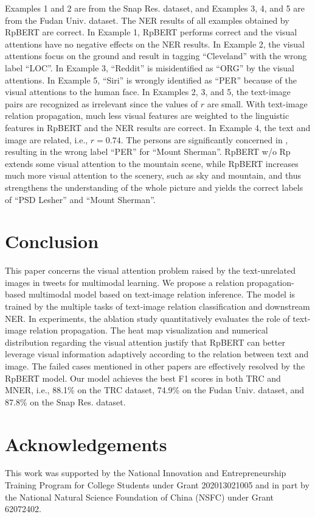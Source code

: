 \documentclass[letterpaper]{article} \usepackage{aaai21}  \usepackage{times}  \usepackage{helvet} \usepackage{courier}  \usepackage[hyphens]{url}  \usepackage{graphicx} \urlstyle{rm} \def\UrlFont{\rm}  \usepackage{natbib}  \usepackage{caption} \frenchspacing  \setlength{\pdfpagewidth}{8.5in}  \setlength{\pdfpageheight}{11in}
\begin{document}
Examples 1 and 2 are from the Snap Res. dataset, and Examples 3, 4, and 5 are from the Fudan Univ. dataset.
The NER results of all examples obtained by  RpBERT are correct.
In Example 1,  RpBERT performs correct  and the visual attentions have no negative effects on the NER results.   
In Example 2, the visual attentions focus on the ground and result in  tagging ``Cleveland'' with the wrong label ``LOC''.
In Example 3, ``Reddit'' is misidentified as ``ORG'' by  the visual attentions.
In Example 5, ``Siri'' is wrongly identified as ``PER'' because of  the visual attentions to the human face.
In Examples 2, 3, and 5, the text-image pairs are recognized as irrelevant since the values of $r$ are small.
With text-image relation propagation, much less visual features are weighted to the linguistic features in RpBERT and the NER results are  correct.
In Example 4, the text and image are related, i.e., $r=0.74$.
The persons are significantly concerned in \cite{arshad2019aiding}, resulting in the wrong label ``PER'' for ``Mount Sherman''.
RpBERT w/o Rp extends some visual attention to the mountain scene,
while RpBERT increases much more visual attention to the scenery, such as sky and mountain, and thus strengthens the understanding of the whole picture and yields the correct labels of ``PSD Lesher'' and ``Mount Sherman''.





\section{Conclusion}
This paper concerns the visual attention problem raised by the text-unrelated images in tweets for multimodal learning.
We propose a relation propagation-based multimodal model based on text-image relation inference.
The model is trained by the multiple tasks of  text-image relation classification and downstream NER.
In experiments, the ablation study quantitatively evaluates the role of text-image relation propagation.
The heat map visualization and  numerical distribution regarding the visual attention justify that RpBERT can better leverage visual information adaptively according to the relation between text and image.
The failed cases mentioned in other papers are effectively resolved by the RpBERT model.
Our model achieves the best F1 scores in both TRC and MNER, i.e., 88.1\% on the TRC dataset, 74.9\% on the Fudan Univ. dataset, and 87.8\% on the Snap Res. dataset.



\section{Acknowledgements}
This work was supported by the National Innovation and Entrepreneurship Training Program for College Students under Grant 202013021005 
and in part by the National Natural Science Foundation of China (NSFC) under Grant 62072402.



\end{document}
